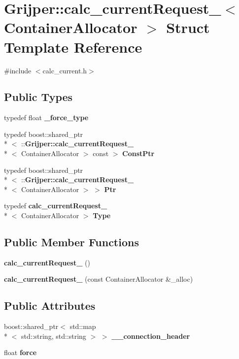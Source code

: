 \section{Grijper\-:\-:calc\-\_\-current\-Request\-\_\-$<$ Container\-Allocator $>$ Struct Template Reference}
\label{structGrijper_1_1calc__currentRequest__}


{\ttfamily \#include $<$calc\-\_\-current.\-h$>$}

\subsection*{Public Types}
\begin{DoxyCompactItemize}
\item 
typedef float {\bf \-\_\-force\-\_\-type}
\item 
typedef boost\-::shared\-\_\-ptr\\*
$<$ \-::{\bf Grijper\-::calc\-\_\-current\-Request\-\_\-}\\*
$<$ Container\-Allocator $>$ const  $>$ {\bf Const\-Ptr}
\item 
typedef boost\-::shared\-\_\-ptr\\*
$<$ \-::{\bf Grijper\-::calc\-\_\-current\-Request\-\_\-}\\*
$<$ Container\-Allocator $>$ $>$ {\bf Ptr}
\item 
typedef {\bf calc\-\_\-current\-Request\-\_\-}\\*
$<$ Container\-Allocator $>$ {\bf Type}
\end{DoxyCompactItemize}
\subsection*{Public Member Functions}
\begin{DoxyCompactItemize}
\item 
{\bf calc\-\_\-current\-Request\-\_\-} ()
\item 
{\bf calc\-\_\-current\-Request\-\_\-} (const Container\-Allocator \&\-\_\-alloc)
\end{DoxyCompactItemize}
\subsection*{Public Attributes}
\begin{DoxyCompactItemize}
\item 
boost\-::shared\-\_\-ptr$<$ std\-::map\\*
$<$ std\-::string, std\-::string $>$ $>$ {\bf \-\_\-\-\_\-connection\-\_\-header}
\item 
float {\bf force}
\end{DoxyCompactItemize}


